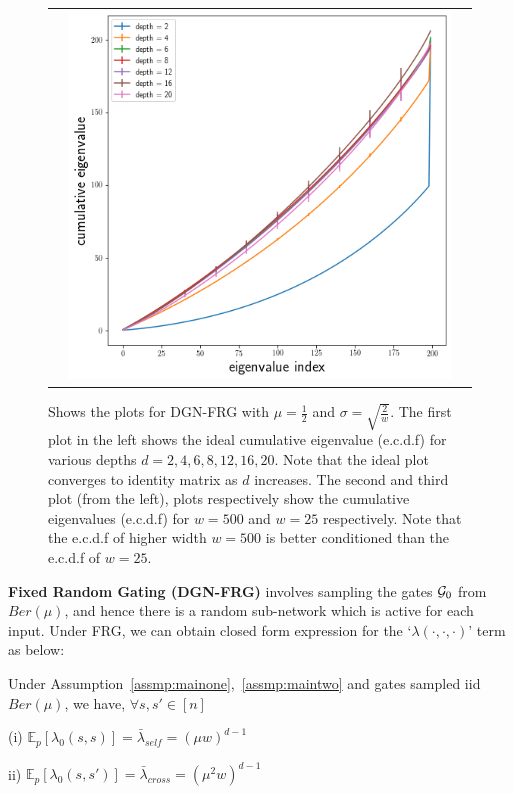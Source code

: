 \begin{figure}
{\begin{tabular}{ccc}
&
\includegraphics[scale=0.4]{figs/dgn-fra-ecdfbyd-w500.png}
\end{tabular}
}
\caption{Shows the plots for DGN-FRG with $\mu=\frac{1}{2}$ and $\sigma=\sqrt{\frac{2}{w}}$. The first plot in the left shows the ideal cumulative eigenvalue (e.c.d.f) for various depths $d=2,4,6,8,12,16,20$. Note that the ideal plot converges to identity matrix as $d$ increases. The second and third plot (from the left),  
plots respectively show the cumulative eigenvalues (e.c.d.f) for $w=500$ and $w=25$ respectively. Note that the e.c.d.f of higher width $w=500$ is better conditioned than the e.c.d.f of $w=25$.}
\label{fig:dgn-frg-gram-ecdf}
\end{figure}



\textbf{Fixed Random Gating (DGN-FRG)} involves sampling the gates $\mathcal{G}_0$ from $Ber\left(\mu\right)$, and hence there is a random sub-network which is active for each input. Under FRG, we can obtain closed form expression for the `$\lambda(\cdot,\cdot,\cdot)$' term as below:

\begin{lemma}\label{lm:dgn-fra}  
 Under Assumption~\ref{assmp:mainone},~\ref{assmp:maintwo} and gates sampled iid $Ber(\mu)$, we have, $\forall s,s'\in[n]$

(i) $\mathbb{E}_p\left[\lambda_0(s,s)\right]=\bar{\lambda}_{self}=(\mu w)^{d-1}$

ii) $\mathbb{E}_p\left[\lambda_0(s,s')\right]=\bar{\lambda}_{cross}= (\mu^2w)^{d-1}$
\end{lemma}

